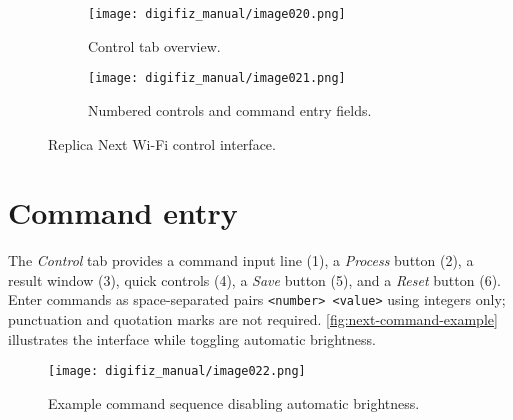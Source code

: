 \begin{figure}[htbp]
    \centering
    \begin{subfigure}{0.48\textwidth}
        \texttt{[image: digifiz\_manual/image020.png]}
        \caption{Control tab overview.}
    \end{subfigure}\hfill
    \begin{subfigure}{0.48\textwidth}
        \texttt{[image: digifiz\_manual/image021.png]}
        \caption{Numbered controls and command entry fields.}
    \end{subfigure}
    \caption{Replica Next Wi-Fi control interface.}
    \label{fig:next-control-tabs}
\end{figure}

\section{Command entry}
The \emph{Control} tab provides a command input line (1), a \emph{Process} button (2), a result window (3), quick controls (4), a \emph{Save} button (5), and a \emph{Reset} button (6). Enter commands as space-separated pairs \verb|<number> <value>| using integers only; punctuation and quotation marks are not required. \autoref{fig:next-command-example} illustrates the interface while toggling automatic brightness.

\begin{figure}[htbp]
    \centering
    \texttt{[image: digifiz\_manual/image022.png]}
    \caption{Example command sequence disabling automatic brightness.}
    \label{fig:next-command-example}
\end{figure}

